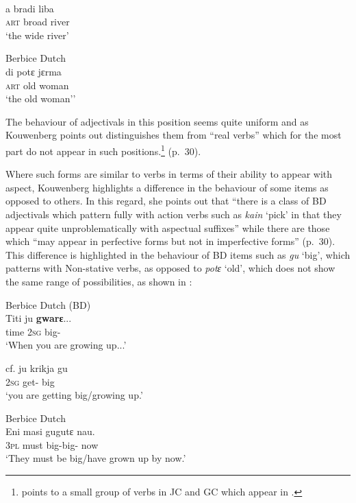 \ex
{}\\
\gll        a bradi liba \\
	\textsc{art} broad river    \\
\glt      `the wide river'

\ex
Berbice Dutch\\
\gll        di potɛ jɛrma   \\
	\textsc{art} old woman  \\
\glt `the old woman''  \z \z

The behaviour of adjectivals in this position seems quite uniform and
as Kouwenberg points out distinguishes them from ``real verbs'' which
for the most part do not appear in such positions.\footnote{\citet{Winford1993} points to a small group of   verbs in JC and GC which appear in .} (p.~30).

Where such forms are similar to verbs in terms of their ability to
appear with  aspect, Kouwenberg highlights a difference in
the behaviour of some items as opposed to others.  In this regard, she
points out that ``there is a class of BD adjectivals which pattern
fully with action verbs such as \textit{kain} `pick' in that they
appear quite unproblematically with aspectual suffixes” while there
are those which ``may appear in perfective forms but not in
imperfective forms” (p.~30).  This difference is highlighted in the
behaviour of BD items such as \textit{gu} `big', which patterns with
Non-stative verbs, as opposed to \textit{potɛ} `old', which does not
show the same range of possibilities, as shown in :\largerpage[2]

\ea%
\label{ex:3:13}
\citep[30]{Kouwenberg1996} \ea
Berbice Dutch (BD)\\
\gll  Titi      ju \textbf{gwarɛ}...       \\
         time \textsc{2sg} big-{\IPF}        \\
\glt `When you are growing up...'

cf. \gll  ju krikja gu\\
\textsc{2sg} get-{\IPF} big\\
\glt `you are getting big\slash growing up.'


\ex
Berbice Dutch\\
\gll         Eni masi gugutɛ nau.          \\
	\textsc{3pl} must big-big-{\PF} now                   \\
\glt       `They must be big\slash have grown up by now.'

